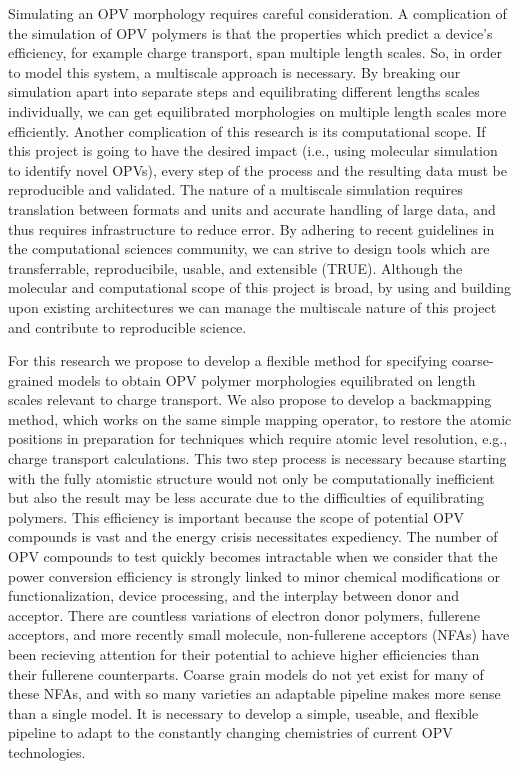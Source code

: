 Simulating an OPV morphology requires careful consideration. %
A complication of the simulation of OPV polymers is that the properties which predict a device's efficiency, for example charge transport, span multiple length scales.
So, in order to model this system, a multiscale approach is necessary.
By breaking our simulation apart into separate steps and equilibrating different lengths scales individually, we can get equilibrated morphologies on multiple length scales more efficiently.
Another complication of this research is its computational scope.
If this project is going to have the desired impact (i.e., using molecular simulation to identify novel OPVs), every step of the process and the resulting data must be reproducible and validated.
The nature of a multiscale simulation requires translation between formats and units and accurate handling of large data, and thus requires infrastructure to reduce error.
By adhering to recent guidelines in the computational sciences community, we can strive to design tools which are transferrable, reproducibile, usable, and extensible (TRUE)\cite{Thompson2020}.
Although the molecular and computational scope of this project is broad, by using and building upon existing architectures we can manage the multiscale nature of this project and contribute to reproducible science. %

For this research we propose to develop a flexible method for specifying coarse-grained models to obtain OPV polymer morphologies equilibrated on length scales relevant to charge transport.
We also propose to develop a backmapping method, which works on the same simple mapping operator, to restore the atomic positions in preparation for techniques which require atomic level resolution, e.g., charge transport calculations.
This two step process is necessary because starting with the fully atomistic structure would not only be computationally inefficient but also the result may be less accurate due to the difficulties of equilibrating polymers\cite{Gartner2019a}.
This efficiency is important because the scope of potential OPV compounds is vast and the energy crisis necessitates expediency.
The number of OPV compounds to test quickly becomes intractable when we consider that the power conversion efficiency is strongly linked to minor chemical modifications or functionalization, device processing, and the interplay between donor and acceptor\cite{Mazzio2015,Swick2019a}.
There are countless variations of electron donor polymers, fullerene acceptors, and more recently small molecule, non-fullerene acceptors (NFAs) have been recieving attention for their potential to achieve higher efficiencies than their fullerene counterparts\cite{Dou2013}.
Coarse grain models do not yet exist for many of these NFAs, and with so many varieties an adaptable pipeline makes more sense than a single model.
It is necessary to develop a simple, useable, and flexible pipeline to adapt to the constantly changing chemistries of current OPV technologies.

